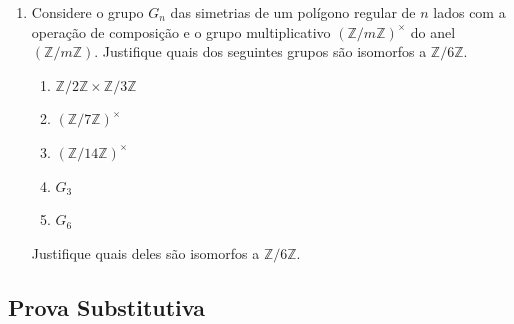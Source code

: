 \begin{enumerate}[left=0.5cm, align=left, nosep]
    \item Considere o grupo $G_n$ das simetrias de um polígono regular de $n$ lados com a operação de composição e o 
    grupo multiplicativo $(\mathbb{Z}/m\mathbb{Z})^{\times}$ do anel $(\mathbb{Z}/m\mathbb{Z})$. Justifique quais dos 
    seguintes grupos são isomorfos a $\mathbb{Z}/6\mathbb{Z}$.
    \begin{enumerate}[label=(\roman*), left=0.5cm, align=left, nosep]
        \item $\mathbb{Z}/2\mathbb{Z} \times \mathbb{Z}/3\mathbb{Z}$
        \item $(\mathbb{Z}/7\mathbb{Z})^{\times}$
        \item $(\mathbb{Z}/14\mathbb{Z})^{\times}$
        \item $G_3$
        \item $G_6$
    \end{enumerate}
    Justifique quais deles são isomorfos a $\mathbb{Z}/6\mathbb{Z}$.
\end{enumerate}

\subsection{Prova Substitutiva}

